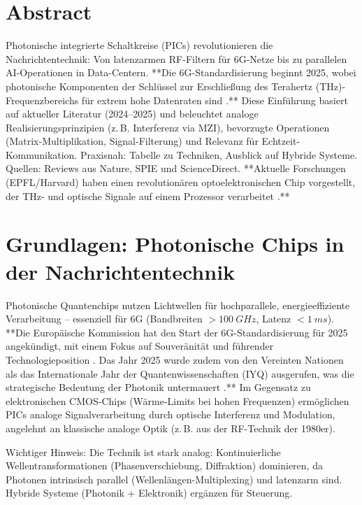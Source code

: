 
	\section*{Abstract}
	Photonische integrierte Schaltkreise (PICs) revolutionieren die Nachrichtentechnik: Von latenzarmen RF-Filtern für 6G-Netze bis zu parallelen AI-Operationen in Data-Centern. **Die 6G-Standardisierung beginnt 2025, wobei photonische Komponenten der Schlüssel zur Erschließung des Terahertz (THz)-Frequenzbereichs für extrem hohe Datenraten sind \cite{6g_roadmap}.** Diese Einführung basiert auf aktueller Literatur (2024–2025) und beleuchtet analoge Realisierungsprinzipien (z.\,B. Interferenz via MZI), bevorzugte Operationen (Matrix-Multiplikation, Signal-Filterung) und Relevanz für Echtzeit-Kommunikation. Praxisnah: Tabelle zu Techniken, Ausblick auf Hybride Systeme. Quellen: Reviews aus Nature, SPIE und ScienceDirect. **Aktuelle Forschungen (EPFL/Harvard) haben einen revolutionären optoelektronischen Chip vorgestellt, der THz- und optische Signale auf einem Prozessor verarbeitet \cite{thz_epfl}.**
	
	\section{Grundlagen: Photonische Chips in der Nachrichtentechnik}
	
	Photonische Quantenchips nutzen Lichtwellen für hochparallele, energieeffiziente Verarbeitung – essenziell für 6G (Bandbreiten $>\SI{100}{GHz}$, Latenz $<\SI{1}{ms}$). **Die Europäische Kommission hat den Start der 6G-Standardisierung für 2025 angekündigt, mit einem Fokus auf Souveränität und führender Technologieposition \cite{6g_roadmap}. Das Jahr 2025 wurde zudem von den Vereinten Nationen als das Internationale Jahr der Quantenwissenschaften (IYQ) ausgerufen, was die strategische Bedeutung der Photonik untermauert \cite{quantenjahr25}.** Im Gegensatz zu elektronischen CMOS-Chips (Wärme-Limits bei hohen Frequenzen) ermöglichen PICs analoge Signalverarbeitung durch optische Interferenz und Modulation, angelehnt an klassische analoge Optik (z.\,B. aus der RF-Technik der 1980er).
	\begin{important}
		Wichtiger Hinweis: Die Technik ist stark analog: Kontinuierliche Wellentransformationen (Phasenverschiebung, Diffraktion) dominieren, da Photonen intrinsisch parallel (Wellenlängen-Multiplexing) und latenzarm sind. Hybride Systeme (Photonik + Elektronik) ergänzen für Steuerung.
	\end{important}
	
